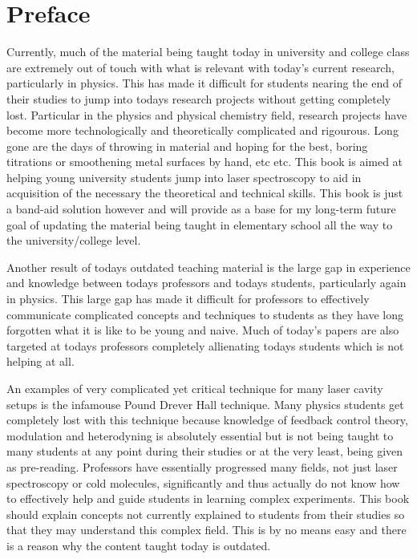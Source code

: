 \documentclass[a4paper]{book}
\begin{document}
	
	\frontmatter
		
	\chapter{Preface}

		Currently, much of the material being taught today in university and college class are extremely out of touch with what is relevant with today's current research, particularly in physics. This has made it difficult for students nearing the end of their studies to jump into todays research projects without getting completely lost. Particular in the physics and physical chemistry field, research projects have become more technologically and theoretically complicated and rigourous. Long gone are the days of throwing in material and hoping for the best, boring titrations or smoothening metal surfaces by hand, etc etc. This book is aimed at helping young university students jump into laser spectroscopy to aid in acquisition of the necessary the theoretical and technical skills. This book is just a band-aid solution however and will provide as a base for my long-term future goal of updating the material being taught in elementary school all the way to the university/college level. 
		
		Another result of todays outdated teaching material is the large gap in experience and knowledge between todays professors and todays students, particularly again in physics. This large gap has made it difficult for professors to effectively communicate complicated concepts and techniques to students as they have long forgotten what it is like to be young and naive. Much of today's papers are also targeted at todays professors completely allienating todays students which is not helping at all.
		
		An examples of very complicated yet critical technique for many laser cavity setups is the infamouse Pound Drever Hall technique. Many physics students get completely lost with this technique because knowledge of feedback control theory, modulation and heterodyning is absolutely essential but is not being taught to many students at any point during their studies or at the very least, being given as pre-reading. Professors have essentially progressed many fields, not just laser spectroscopy or cold molecules, significantly and thus actually do not know how to effectively help and guide students in learning complex experiments. This book should explain concepts not currently explained to students from their studies so that they may understand this complex field. This is by no means easy and there is a reason why the content taught today is outdated.
		
\end{document}
